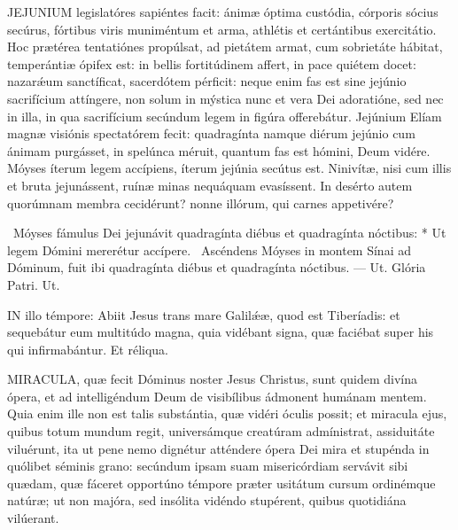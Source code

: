 
\lettrine[lines=2]{J}{EJUNIUM} legislatóres sapiéntes facit: ánimæ óptima custódia, córporis sócius secúrus, fórtibus viris muniméntum et arma, athlétis et certántibus exercitátio. Hoc prætérea tentatiónes propúlsat, ad pietátem armat, cum sobrietáte hábitat, temperántiæ ópifex est: in bellis fortitúdinem affert, in pace quiétem docet: nazarǽum sanctíficat, sacerdótem pérficit: neque enim fas est sine jejúnio sacrifícium attíngere, non solum in mýstica nunc et vera Dei adoratióne, sed nec in illa, in qua sacrifícium secúndum legem in figúra offerebátur. Jejúnium Elíam magnæ visiónis spectatórem fecit: quadragínta namque diérum jejúnio cum ánimam purgásset, in spelúnca méruit, quantum fas est hómini, Deum vidére. Móyses íterum legem accípiens, íterum jejúnia secútus est. Ninivítæ, nisi cum illis et bruta jejunássent, ruínæ minas nequáquam evasíssent. In desérto autem quorúmnam membra cecidérunt? nonne illórum, qui carnes appetivére?

\R\ Móyses fámulus Dei jejunávit quadragínta diébus et quadragínta nóctibus: * Ut legem Dómini mererétur accípere. \V\ Ascéndens Móyses in montem Sínai ad Dóminum, fuit ibi quadragínta diébus et quadragínta nóctibus. --- Ut. Glória Patri. Ut.




\lettrine[lines=2]{I}{N} illo témpore: Abiit Jesus trans mare Galilǽæ, quod est Tiberíadis: et sequebátur eum multitúdo magna, quia vidébant signa, quæ faciébat super his qui infirmabántur. Et réliqua.



\lettrine[lines=2]{M}{IRACULA}, quæ fecit Dóminus noster Jesus Christus, sunt quidem divína ópera, et ad intelligéndum Deum de visibílibus ádmonent humánam mentem. Quia enim ille non est talis substántia, quæ vidéri óculis possit; et miracula ejus, quibus totum mundum regit, universámque creatúram admínistrat, assiduitáte viluérunt, ita ut pene nemo dignétur atténdere ópera Dei mira et stupénda in quólibet séminis grano: secúndum ipsam suam misericórdiam servávit sibi quædam, quæ fáceret opportúno témpore præter usitátum cursum ordinémque natúræ; ut non majóra, sed insólita vidéndo stupérent, quibus quotidiána vilúerant.

